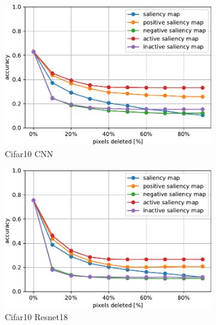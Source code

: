 \documentclass[preprint,12pt]{elsarticle}
\begin{document}
\begin{figure}
    \centering
    \begin{subfigure}{0.49\linewidth}
        \centering
        \includegraphics[width=\linewidth]{../visualizations/benchmarks/white_deletion/cifar10_cnn.pdf}
        \caption{Cifar10 CNN}
    \end{subfigure}
    \hfill
    \begin{subfigure}{0.49\linewidth}
        \centering
        \includegraphics[width=\linewidth]{../visualizations/benchmarks/white_deletion/cifar10_resnet18.pdf}
        \caption{Cifar10 Resnet18}
    \end{subfigure}\\
    \hfill
    \begin{subfigure}{0.49\textwidth}
        \centering

\end{subfigure}
\end{figure}
\end{document}
